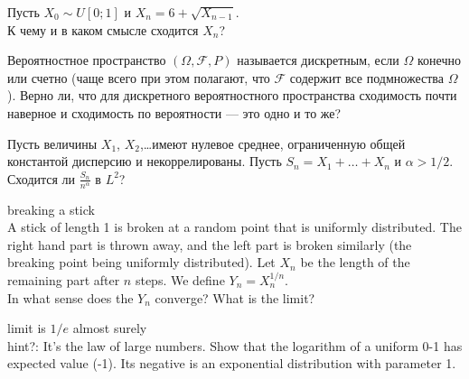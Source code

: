 \begin{problem}
Пусть $X_{0}\sim U[0;1]$ и $X_{n}=6+\sqrt{X_{n-1}}$. \\
К чему и в каком смысле сходится $X_{n}$? 
\end{problem} 
\begin{solution} 

\end{solution}

\begin{problem}
Вероятностное пространство $(\Omega,\mathcal{F},P)$ называется
дискретным, если $\Omega$ конечно или счетно (чаще всего при этом
полагают, что $\mathcal{F}$ содержит все подмножества $\Omega$).
Верно ли, что для дискретного вероятностного пространства
сходимость почти наверное и сходимость по вероятности --- это одно и
то же? 
\end{problem} 
\begin{solution} 

\end{solution}

\begin{problem}
Пусть величины $X_{1}$, $X_{2}$,\ldots имеют нулевое среднее, ограниченную общей константой дисперсию и некоррелированы. Пусть $S_{n}=X_{1}+\ldots+X_{n}$ и $\alpha>1/2$.\\
Сходится ли $\frac{S_{n}}{n^{\alpha}}$ в $L^{2}$? 
\end{problem} 
\begin{solution} 

\end{solution}

\begin{problem}
 breaking a stick \\
A stick of length 1 is broken at a random point that is uniformly distributed. The right hand part is thrown away, and the left part is broken similarly (the breaking point being uniformly distributed). Let $X_{n}$ be the length of the remaining part after $n$ steps. We define $Y_{n}=X_{n}^{1/n}$. \\
In what sense does the $Y_{n}$ converge? What is the limit? 
\end{problem} 
\begin{solution} 

limit is $1/e$ almost surely \\
hint?: It's the law of large numbers. Show that the logarithm of a uniform 0-1 has expected value (-1). Its negative is an exponential distribution with parameter 1. 
\end{solution}

